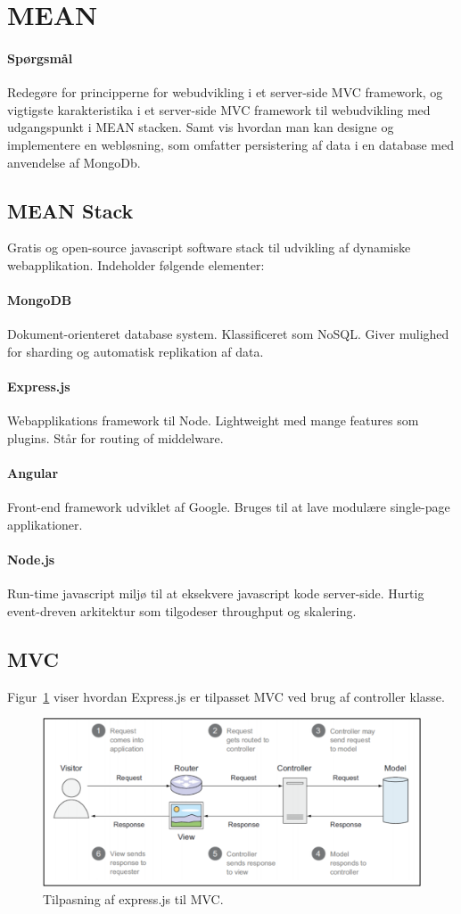 \section{MEAN}

\paragraph{Spørgsmål}
Redegøre for principperne for webudvikling i et server-side MVC framework, og vigtigste karakteristika i et server-side	MVC framework til webudvikling med udgangspunkt i MEAN stacken. Samt vis hvordan man kan designe og implementere en	webløsning, som omfatter persistering af data i en database med anvendelse af MongoDb.

\subsection{MEAN Stack}
Gratis og open-source javascript software stack til udvikling af dynamiske webapplikation. Indeholder følgende elementer:

\paragraph{MongoDB} Dokument-orienteret database system. Klassificeret som NoSQL. Giver mulighed for sharding og automatisk replikation af data.

\paragraph{Express.js} Webapplikations framework til Node. Lightweight med mange features som plugins. Står for routing of middelware.

\paragraph{Angular} Front-end framework udviklet af Google. Bruges til at lave modulære single-page applikationer.

\paragraph{Node.js} Run-time javascript miljø til at eksekvere javascript kode server-side. Hurtig event-dreven arkitektur som tilgodeser throughput og skalering.

\subsection{MVC}
Figur~\ref{fig:mean-mvc} viser hvordan Express.js er tilpasset MVC ved brug af controller klasse.

\begin{figure}[h]
	\centering
	\includegraphics[width=\linewidth]{figs/spm2/mean-mvc}
	\caption{Tilpasning af express.js til MVC.}
	\label{fig:mean-mvc}
\end{figure}
